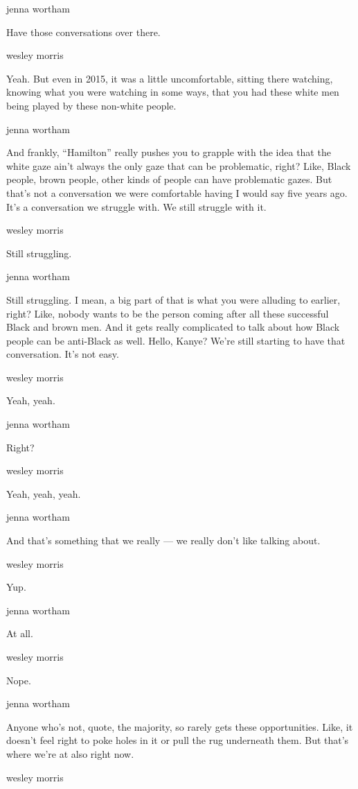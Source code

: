 jenna wortham

Have those conversations over there.

wesley morris

Yeah. But even in 2015, it was a little uncomfortable, sitting there
watching, knowing what you were watching in some ways, that you had
these white men being played by these non-white people.

jenna wortham

And frankly, ``Hamilton'' really pushes you to grapple with the idea
that the white gaze ain't always the only gaze that can be problematic,
right? Like, Black people, brown people, other kinds of people can have
problematic gazes. But that's not a conversation we were comfortable
having I would say five years ago. It's a conversation we struggle with.
We still struggle with it.

wesley morris

Still struggling.

jenna wortham

Still struggling. I mean, a big part of that is what you were alluding
to earlier, right? Like, nobody wants to be the person coming after all
these successful Black and brown men. And it gets really complicated to
talk about how Black people can be anti-Black as well. Hello, Kanye?
We're still starting to have that conversation. It's not easy.

wesley morris

Yeah, yeah.

jenna wortham

Right?

wesley morris

Yeah, yeah, yeah.

jenna wortham

And that's something that we really --- we really don't like talking
about.

wesley morris

Yup.

jenna wortham

At all.

wesley morris

Nope.

jenna wortham

Anyone who's not, quote, the majority, so rarely gets these
opportunities. Like, it doesn't feel right to poke holes in it or pull
the rug underneath them. But that's where we're at also right now.

wesley morris

